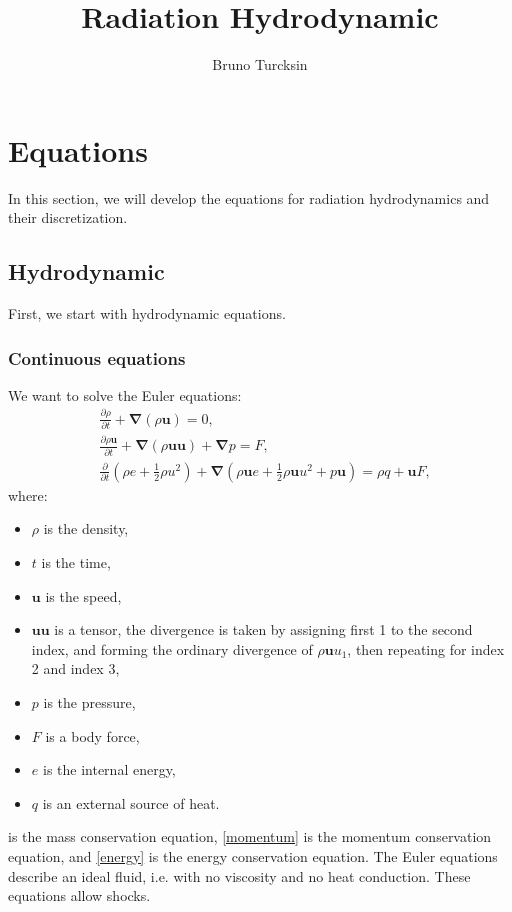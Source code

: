 \documentclass[letterpaper]{report}
\newcommand\bn{\boldsymbol{\nabla}}
\newcommand\bs{\boldsymbol}
\renewcommand{\(}{\left(}
\renewcommand{\)}{\right)}
\renewcommand{\[}{\left[}
\renewcommand{\]}{\right]}
\begin{document}
\title{Radiation Hydrodynamic}
\author{Bruno Turcksin} 
\date{}
\maketitle

\chapter{Equations}
In this section, we will develop the equations for radiation hydrodynamics and
their discretization.
\section{Hydrodynamic}
First, we start with hydrodynamic equations.
\subsection{Continuous equations}
We want to solve the Euler equations:
\begin{align}
  &\frac{\partial \rho}{\partial t} + \bn (\rho \bs{u}) = 0 \label{mass},\\
  &\frac{\partial \rho \bs{u}}{\partial t} + \bn (\rho\bs{u}\bs{u}) + \bn p =
  F \label{momentum},\\
  &\frac{\partial}{\partial t}\(\rho e +\frac{1}{2}\rho u^2\) +
  \bn\(\rho\bs{u}e + \frac{1}{2}\rho \bs{u} u^2+p\bs{u}\) = \rho q +\bs{u}F
  \label{energy},
\end{align}
where:
\begin{itemize}
  \item $\rho$ is the density,
  \item $t$ is the time,
  \item $\bs{u}$ is the speed,
  \item $\bs{u}\bs{u}$ is a tensor, the divergence is taken by assigning first
  1 to the second index, and forming the ordinary divergence of
  $\rho\bs{u}u_1$, then repeating for index 2 and index 3,
  \item $p$ is the pressure,
  \item $F$ is a body force,
  \item $e$ is the internal energy,
  \item $q$ is an external source of heat.
\end{itemize}
 is the mass conservation equation, \cref{momentum} is the momentum
conservation equation, and \cref{energy} is the energy conservation equation.
The Euler equations describe an ideal fluid, i.e. with no viscosity and no heat
conduction. These equations allow shocks.
\end{document}
